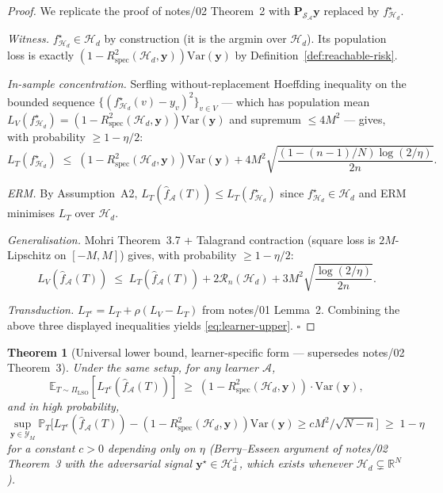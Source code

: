 \documentclass[11pt,a4paper]{article}
\theoremstyle{plain}
\newtheorem{theorem}{Theorem}
\theoremstyle{definition}
\theoremstyle{remark}
\newcommand{\by}{\mathbf{y}}
\newcommand{\bP}{\mathbf{P}}
\newcommand{\E}{\mathbb{E}}
\newcommand{\R}{\mathbb{R}}
\newcommand{\Var}{\mathrm{Var}}
\newcommand{\Rspec}{R^2_{\mathrm{spec}}}
\newcommand{\Scal}{\mathcal{S}}
\newcommand{\Acal}{\mathcal{A}}
\newcommand{\Hcal}{\mathcal{H}}
\newcommand{\Ycal}{\mathcal{Y}}
\begin{document}
\begin{proof}
We replicate the proof of notes/02 Theorem~2 with $\bP_{\Scal_\Acal}\by$
replaced by $f^\star_{\Hcal_d}$.

\textit{Witness.}  $f^\star_{\Hcal_d} \in \Hcal_d$ by construction (it is
the argmin over $\Hcal_d$).  Its population loss is exactly
$(1 - \Rspec(\Hcal_d, \by))\Var(\by)$ by Definition~\ref{def:reachable-risk}.

\textit{In-sample concentration.}  Serfling without-replacement Hoeffding
inequality on the bounded sequence
$\{(f^\star_{\Hcal_d}(v) - y_v)^2\}_{v \in V}$ — which has population
mean $L_V(f^\star_{\Hcal_d}) = (1 - \Rspec(\Hcal_d, \by))\Var(\by)$
and supremum $\leq 4M^2$ — gives, with probability $\geq 1 - \eta/2$:
\begin{equation}
    L_T(f^\star_{\Hcal_d}) \;\leq\; (1 - \Rspec(\Hcal_d, \by))\Var(\by) + 4M^2 \sqrt{\frac{(1 - (n-1)/N)\log(2/\eta)}{2 n}}.
\end{equation}

\textit{ERM.}  By Assumption~A2, $L_T(\hat f_\Acal(T)) \leq L_T(f^\star_{\Hcal_d})$
since $f^\star_{\Hcal_d} \in \Hcal_d$ and ERM minimises $L_T$ over $\Hcal_d$.

\textit{Generalisation.}  Mohri Theorem~3.7 + Talagrand contraction
(square loss is $2M$-Lipschitz on $[-M, M]$) gives, with probability
$\geq 1 - \eta/2$:
\begin{equation}
    L_V(\hat f_\Acal(T)) \;\leq\; L_T(\hat f_\Acal(T)) + 2 \mathcal{R}_n(\Hcal_d) + 3 M^2 \sqrt{\frac{\log(2/\eta)}{2 n}}.
\end{equation}

\textit{Transduction.}  $L_{T^c} = L_T + \rho(L_V - L_T)$ from notes/01
Lemma~2.  Combining the above three displayed inequalities yields
\eqref{eq:learner-upper}.  $\square$
\end{proof}

\begin{theorem}[Universal lower bound, learner-specific form — supersedes
notes/02 Theorem~3]
\label{thm:learner-specific-lower}
Under the same setup, for any learner $\Acal$,
\begin{equation}
    \E_{T \sim \Pi_{\mathrm{LSO}}}[L_{T^c}(\hat f_\Acal(T))]
    \;\geq\; (1 - \Rspec(\Hcal_d, \by)) \cdot \Var(\by),
    \label{eq:learner-lower-expectation}
\end{equation}
and in high probability,
\begin{equation}
    \sup_{\by \in \Ycal_M} \mathbb{P}_T\Big[
        L_{T^c}(\hat f_\Acal(T)) - (1 - \Rspec(\Hcal_d, \by))\Var(\by) \geq c M^2 / \sqrt{N - n}
    \Big] \;\geq\; 1 - \eta
    \label{eq:learner-lower-hp}
\end{equation}
for a constant $c > 0$ depending only on $\eta$ (Berry--Esseen argument
of notes/02 Theorem~3 with the adversarial signal $\by^\star \in
\Hcal_d^\perp$, which exists whenever $\Hcal_d \subsetneq \R^N$).
\end{theorem}
\end{document}

